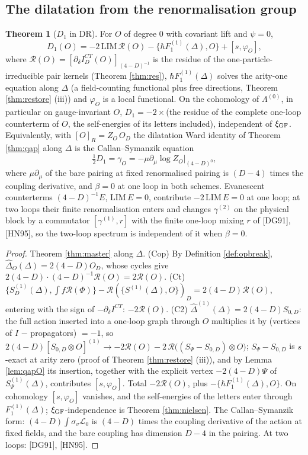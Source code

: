 \documentclass[11pt]{article}
\theoremstyle{definition}
\newtheorem{theorem}[definition]{Theorem}
\numberwithin{equation}{section}
\begin{document}
\subsection{The dilatation from the renormalisation group}

\begin{theorem}[$D_1$ in DR]
\label{thm:D1}
For $O$ of degree $0$ with covariant lift and $\psi=0$,
\[
D_1(O)=-2\,\mathrm{LIM}\,\mathcal R(O)-\{\hbar F^{(1)}_1(\Delta),O\}+[s,\varphi_O],
\]
where $\mathcal R(O)=[\partial_\delta I^{CT}_D(O)]_{(4-D)^{-1}}$ is the residue of the one-particle-irreducible pair kernels (Theorem \ref{thm:res}), $\hbar F^{(1)}_1(\Delta)$ solves the arity-one equation along $\Delta$ (a field-counting functional plus free directions, Theorem \ref{thm:restore} (iii)) and $\varphi_O$ is a local functional. On the cohomology of $\Lambda^{(0)}$, in particular on gauge-invariant $O$, $D_1=-2\times$(the residue of the complete one-loop counterterm of $O$, the self-energies of its letters included), independent of $\xi_{\rm GF}$. Equivalently, with $[O]_R=Z_O\,O_D$ the dilatation Ward identity of Theorem \ref{thm:qap} along $\Delta$ is the Callan--Symanzik equation
\[
\tfrac12D_1=\gamma_O=-\mu\partial_\mu\log Z_O\big|_{(4-D)^0},
\]
where $\mu\partial_\mu$ of the bare pairing at fixed renormalised pairing is $(D-4)$ times the coupling derivative, and $\beta=0$ at one loop in both schemes. Evanescent counterterms $(4-D)^{-1}E$, $\mathrm{LIM}\,E=0$, contribute $-2\,\mathrm{LIM}\,E=0$ at one loop; at two loops their finite renormalisation enters and changes $\gamma^{(2)}$ on the physical block by a commutator $[\gamma^{(1)},r]$ with the finite one-loop mixing $r$ of [DG91], [HN95], so the two-loop spectrum is independent of it when $\beta=0$.
\end{theorem}

\begin{proof}
Theorem \ref{thm:master} along $\Delta$. (Cop) By Definition \ref{def:opbreak}, $\widehat\Delta_O(\Delta)=2(4-D)O_D$, whose cycles give $2(4-D)\cdot(4-D)^{-1}\mathcal R(O)=2\mathcal R(O)$. (Ct) $\{S^{(1)}_D(\Delta),\int f\mathcal R(\Phi)\}-\mathcal R(\{S^{(1)}(\Delta),O\})_D=2(4-D)\mathcal R(O)$, entering with the sign of $-\partial_\delta I^{CT}$: $-2\mathcal R(O)$. (C2) $\widehat\Delta^{(1)}(\Delta)=2(4-D)S_{0,D}$: the full action inserted into a one-loop graph through $O$ multiplies it by (vertices of $I$ $-$ propagators) $=-1$, so $2(4-D)[S_{0,D}\otimes O]^{(1)}\to-2\mathcal R(O)-2\,\mathcal R\big((S_\Psi-S_{0,D})\otimes O\big)$; $S_\Psi-S_{0,D}$ is $s$-exact at arity zero (proof of Theorem \ref{thm:restore} (iii)), and by Lemma \ref{lem:qapO} its insertion, together with the explicit vertex $-2(4-D)\Psi$ of $S^{(1)}_\Psi(\Delta)$, contributes $[s,\varphi_O]$. Total $-2\mathcal R(O)$, plus $-\{\hbar F_1^{(1)}(\Delta),O\}$. On cohomology $[s,\varphi_O]$ vanishes, and the self-energies of the letters enter through $F_1^{(1)}(\Delta)$; $\xi_{\rm GF}$-independence is Theorem \ref{thm:nielsen}. The Callan--Symanzik form: $(4-D)\int\sigma_v\mathscr L_0$ is $(4-D)$ times the coupling derivative of the action at fixed fields, and the bare coupling has dimension $D-4$ in the pairing. At two loops: [DG91], [HN95].
\end{proof}
\end{document}
